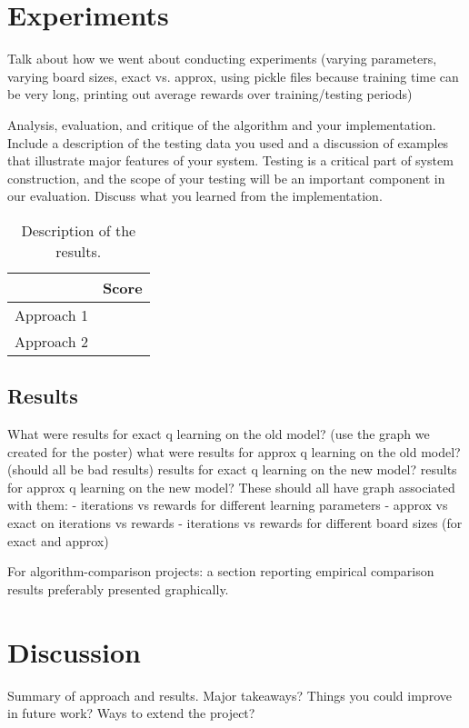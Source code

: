 \documentclass[11pt]{article}
\begin{document}
\section{Experiments}

Talk about how we went about conducting experiments (varying parameters, varying board sizes, exact vs. approx, using pickle files because training time can be very long, printing out average rewards over training/testing periods)

Analysis, evaluation, and critique of the algorithm and your
implementation. Include a description of the testing data you used and
a discussion of examples that illustrate major features of your
system. Testing is a critical part of system construction, and the
scope of your testing will be an important component in our
evaluation. Discuss what you learned from the implementation.

\begin{table}
  \centering
  \begin{tabular}{ll}
    \toprule
    & Score \\
    \midrule
    Approach 1 & \\
    Approach 2 & \\
    \bottomrule
  \end{tabular}
  \caption{Description of the results.}
\end{table}


\subsection{Results}
What were results for exact q learning on the old model? (use the graph we created for the poster)
what were results for approx q learning on the old model? (should all be bad results)
results for exact q learning on the new model?
results for approx q learning on the new model?
These should all have graph associated with them:
- iterations vs rewards for different learning parameters
- approx vs exact on iterations vs rewards
- iterations vs rewards for different board sizes (for exact and approx)

 For algorithm-comparison projects: a section reporting empirical comparison results preferably presented graphically.


\section{Discussion}

Summary of approach and results. Major takeaways? Things you could improve in future work? Ways to extend the project?
\end{document}
